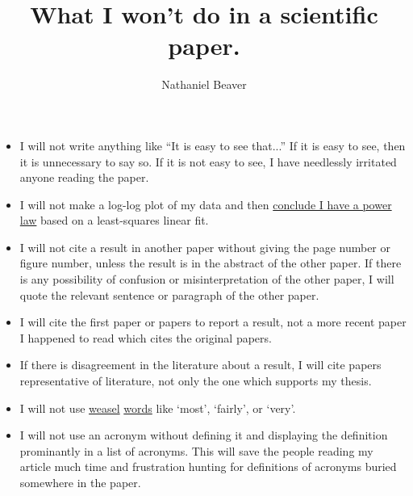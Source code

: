 \documentclass[12pt,letterpaper]{article}
\author{Nathaniel Beaver}
\title{What I won't do in a scientific paper.}
\begin{document}
\maketitle

\begin{itemize}
\item I will not write anything like ``It is easy to see that...'' If it is easy to see, then it is unnecessary to say so. If it is not easy to see, I have needlessly irritated anyone reading the paper.
\item I will not make a log-log plot of my data and then \href{http://vserver1.cscs.lsa.umich.edu/~crshalizi/notebooks/power-laws.html}{conclude I have a power law} based on a least-squares linear fit. 
\item I will not cite a result in another paper without giving the page number or figure number, unless the result is in the abstract of the other paper. If there is any possibility of confusion or misinterpretation of the other paper, I will quote the relevant sentence or paragraph of the other paper.
\item I will cite the first paper or papers to report a result, not a more recent paper I happened to read which cites the original papers.
\item If there is disagreement in the literature about a result, I will cite papers representative of literature, not only the one which supports my thesis.
\item I will not use \href{http://matt.might.net/articles/shell-scripts-for-passive-voice-weasel-words-duplicates/}{weasel} \href{http://en.wikipedia.org/wiki/Weasel_words}{words} like `most', `fairly', or `very'.
\item I will not use an acronym without defining it and displaying the definition prominantly in a list of acronyms. This will save the people reading my article much time and frustration hunting for definitions of acronyms buried somewhere in the paper.
\end{itemize}
\end{document}
